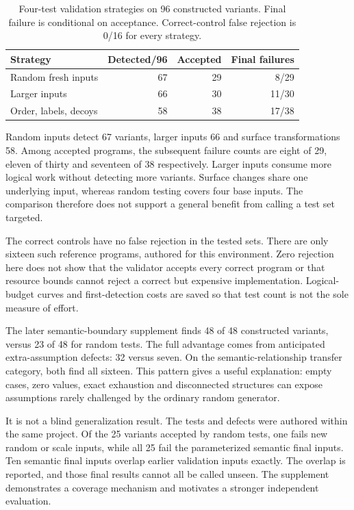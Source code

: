 \documentclass[conference]{IEEEtran}
\newcommand{\smalltable}{\fontsize{8}{9.5}\selectfont}
\begin{document}
\begin{table}[t]
\centering\smalltable
\caption{Four-test validation strategies on 96 constructed variants. Final failure is conditional on acceptance. Correct-control false rejection is 0/16 for every strategy.}
\label{tab:validation}
\begin{tabular}{lrrr}
\toprule
Strategy & Detected/96 & Accepted & Final failures \\
\midrule
Random fresh inputs & 67 & 29 & 8/29 \\
Larger inputs & 66 & 30 & 11/30 \\
Order, labels, decoys & 58 & 38 & 17/38 \\
\bottomrule
\end{tabular}
\end{table}

Random inputs detect 67 variants, larger inputs 66 and surface transformations 58. Among accepted programs, the subsequent failure counts are eight of 29, eleven of thirty and seventeen of 38 respectively. Larger inputs consume more logical work without detecting more variants. Surface changes share one underlying input, whereas random testing covers four base inputs. The comparison therefore does not support a general benefit from calling a test set targeted.

The correct controls have no false rejection in the tested sets. There are only sixteen such reference programs, authored for this environment. Zero rejection here does not show that the validator accepts every correct program or that resource bounds cannot reject a correct but expensive implementation. Logical-budget curves and first-detection costs are saved so that test count is not the sole measure of effort.

The later semantic-boundary supplement finds 48 of 48 constructed variants, versus 23 of 48 for random tests. The full advantage comes from anticipated extra-assumption defects: 32 versus seven. On the semantic-relationship transfer category, both find all sixteen. This pattern gives a useful explanation: empty cases, zero values, exact exhaustion and disconnected structures can expose assumptions rarely challenged by the ordinary random generator.

It is not a blind generalization result. The tests and defects were authored within the same project. Of the 25 variants accepted by random tests, one fails new random or scale inputs, while all 25 fail the parameterized semantic final inputs. Ten semantic final inputs overlap earlier validation inputs exactly. The overlap is reported, and those final results cannot all be called unseen. The supplement demonstrates a coverage mechanism and motivates a stronger independent evaluation.
\end{document}
